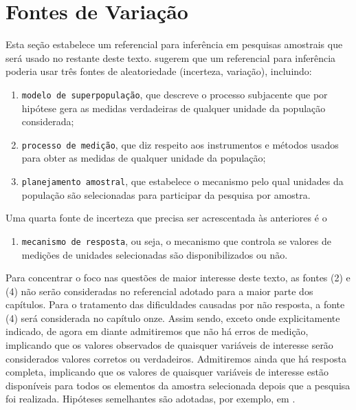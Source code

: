 \documentclass[]{book}
\providecommand{\tightlist}{%
  \setlength{\itemsep}{0pt}\setlength{\parskip}{0pt}}
\numberwithin{example}{chapter}
\numberwithin{remark}{chapter}
\numberwithin{definition}{chapter}
\begin{document}
\section{Fontes de Variação}\label{fontes-de-variacao}

Esta seção estabelece um referencial para inferência em pesquisas
amostrais que será usado no restante deste texto. \citep{cassel} sugerem
que um referencial para inferência poderia usar três fontes de
aleatoriedade (incerteza, variação), incluindo:

\begin{enumerate}
\def\labelenumi{\arabic{enumi}.}
\item
  \texttt{modelo\ de\ superpopulação}, que descreve o processo
  subjacente que por hipótese gera as medidas verdadeiras de qualquer
  unidade da população considerada;
\item
  \texttt{processo\ de\ medição}, que diz respeito aos instrumentos e
  métodos usados para obter as medidas de qualquer unidade da população;
\item
  \texttt{planejamento\ amostral}, que estabelece o mecanismo pelo qual
  unidades da população são selecionadas para participar da pesquisa por
  amostra.
\end{enumerate}

Uma quarta fonte de incerteza que precisa ser acrescentada às anteriores
é o

\begin{enumerate}
\def\labelenumi{\arabic{enumi}.}
\setcounter{enumi}{3}
\tightlist
\item
  \texttt{mecanismo\ de\ resposta}, ou seja, o mecanismo que controla se
  valores de medições de unidades selecionadas são disponibilizados ou
  não.
\end{enumerate}

Para concentrar o foco nas questões de maior interesse deste texto, as
fontes (2) e (4) não serão consideradas no referencial adotado para a
maior parte dos capítulos. Para o tratamento das dificuldades causadas
por não resposta, a fonte (4) será considerada no capítulo onze. Assim
sendo, exceto onde explicitamente indicado, de agora em diante
admitiremos que não há erros de medição, implicando que os valores
observados de quaisquer variáveis de interesse serão considerados
valores corretos ou verdadeiros. Admitiremos ainda que há resposta
completa, implicando que os valores de quaisquer variáveis de interesse
estão disponíveis para todos os elementos da amostra selecionada depois
que a pesquisa foi realizada. Hipóteses semelhantes são adotadas, por
exemplo, em \citep{Mont87}.
\end{document}
